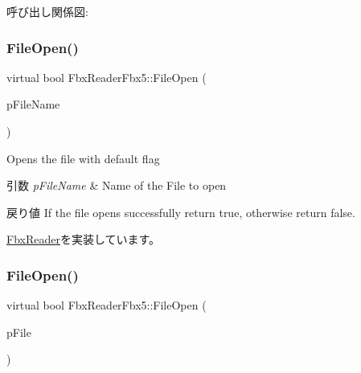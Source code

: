 呼び出し関係図\+:
\mbox{\label{class_fbx_reader_fbx5_a1aef8cc95eae3b44812beef48d6edb5d}} 
\subsubsection{\texorpdfstring{File\+Open()}{FileOpen()}\hspace{0.1cm}{\footnotesize\ttfamily [3/5]}}
{\footnotesize\ttfamily virtual bool Fbx\+Reader\+Fbx5\+::\+File\+Open (\begin{DoxyParamCaption}\item[{char $\ast$}]{p\+File\+Name }\end{DoxyParamCaption})\hspace{0.3cm}{\ttfamily [virtual]}}

Opens the file with default flag 
\begin{DoxyParams}{引数}
{\em p\+File\+Name} & Name of the File to open \\
\hline
\end{DoxyParams}
\begin{DoxyReturn}{戻り値}
If the file opens successfully return {\ttfamily true}, otherwise return {\ttfamily false}. 
\end{DoxyReturn}


\hyperlink{class_fbx_reader_a6105bd37ae86c03f35aee6f62901856d}{Fbx\+Reader}を実装しています。

\mbox{\label{class_fbx_reader_fbx5_ad48fa87e086b236db57f57eed5f50ddb}} 
\subsubsection{\texorpdfstring{File\+Open()}{FileOpen()}\hspace{0.1cm}{\footnotesize\ttfamily [4/5]}}
{\footnotesize\ttfamily virtual bool Fbx\+Reader\+Fbx5\+::\+File\+Open (\begin{DoxyParamCaption}\item[{\hyperlink{class_fbx_file}{Fbx\+File} $\ast$}]{p\+File }\end{DoxyParamCaption})\hspace{0.3cm}{\ttfamily [virtual]}}



